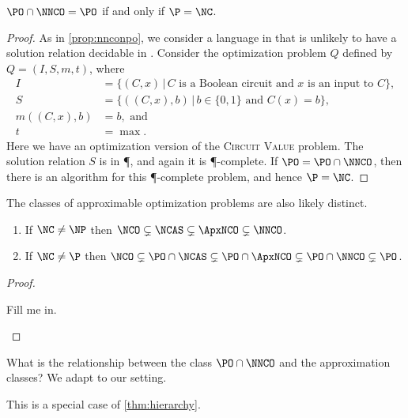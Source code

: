 \documentclass[]{article}
\begin{document}
\begin{proposition}\label{prop:poppo}
  $\PO \cap \NNCO = \PO$ if and only if $\P = \NC$.
\end{proposition}
\begin{proof}
  As in \autoref{prop:nnconpo}, we consider a language in \PO{} that is unlikely to have a solution relation decidable in \NC{}.
  Consider the optimization problem $Q$ defined by $Q = (I, S, m, t)$, where
  \begin{align*}
    I & = \{ (C, x) \, | \, C \text{ is a Boolean circuit and } x \text{ is an input to } C \}, \\
    S & = \{ ((C, x), b) \, | \, b \in \{0, 1\} \text{ and } C(x) = b \}, \\
    m((C, x), b) & = b, \text{ and} \\
    t & = \max.
  \end{align*}
  Here we have an optimization version of the \textsc{Circuit Value} problem.
  The solution relation $S$ is in \P, and again it is \P-complete.
  If $\PO = \PO \cap \NNCO$, then there is an \NC{} algorithm for this \P-complete problem, and hence $\P = \NC$.
\end{proof}

The classes of approximable optimization problems are also likely distinct.

\begin{theorem}\label{thm:hierarchy}
  \mbox{}
  \begin{enumerate}
  \item If $\NC \neq \NP$ then $\NCO \subsetneq \NCAS \subsetneq \ApxNCO \subsetneq \NNCO$.
  \item If $\NC \neq \P$ then $\NCO \subsetneq \PO \cap \NCAS \subsetneq \PO \cap \ApxNCO \subsetneq \PO \cap \NNCO \subsetneq \PO$.
  \end{enumerate}
\end{theorem}
\begin{proof}
  \begin{todo}
    Fill me in.
  \end{todo}
\end{proof}

What is the relationship between the class $\PO \cap \NNCO$ and the \NC{} approximation classes?
We adapt \cite[Theorem~8.2.9]{dsst97} to our setting.
\begin{todo}
  This is a special case of \autoref{thm:hierarchy}.
\end{todo}
\end{document}
